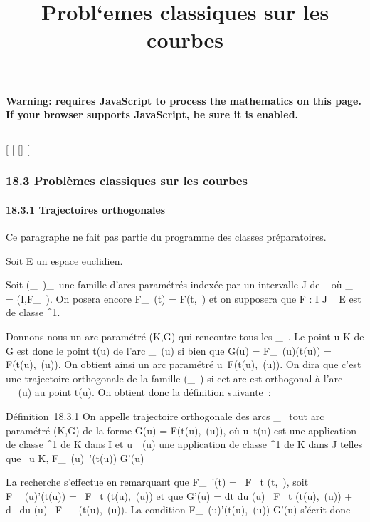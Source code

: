 \documentclass[]{article}
\title{Probl`emes classiques sur les courbes}
\author{}
\date{}
\begin{document}
\maketitle

\textbf{Warning: 
requires JavaScript to process the mathematics on this page.\\ If your
browser supports JavaScript, be sure it is enabled.}

\begin{center}\rule{3in}{0.4pt}\end{center}

[
[
[]
[

\subsubsection{18.3 Problèmes classiques sur les courbes}

\paragraph{18.3.1 Trajectoires orthogonales}

Ce paragraphe ne fait pas partie du programme des classes préparatoires.

Soit E un espace euclidien.

Soit (\Gamma_\lambda~)_\lambda~\inJ une famille d'arcs paramétrés indexée
par un intervalle J de ~ où \Gamma_\lambda~ = (I,F_\lambda~). On posera
encore F_\lambda~(t) = F(t,\lambda~) et on supposera que F : I \times J \rightarrow~ E est de
classe ^1.

Donnons nous un arc paramétré (K,G) qui rencontre tous les \Gamma_\lambda~.
Le point u \in K de G est donc le point t(u) de l'arc \Gamma_\lambda~(u) si
bien que G(u) = F_\lambda~(u)(t(u)) = F(t(u),\lambda~(u)). On obtient ainsi
un arc paramétré u\mapsto~F(t(u),\lambda~(u)). On dira que
c'est une trajectoire orthogonale de la famille (\Gamma_\lambda~) si cet
arc est orthogonal à l'arc \Gamma_\lambda~(u) au point t(u). On obtient
donc la définition suivante~:

Définition~18.3.1 On appelle trajectoire orthogonale des arcs
\Gamma_\lambda~ tout arc paramétré (K,G) de la forme G(u) = F(t(u),\lambda~(u)),
où u\mapsto~t(u) est une application de classe
^1 de K dans I et u\mapsto~\lambda~(u) une
application de classe ^1 de K dans J telles que
\forall~u \in K, F_\lambda~(u)~'(t(u)) \bot G'(u)

La recherche s'effectue en remarquant que F_\lambda~'(t) = \partial~F
\over \partial~t (t,\lambda~), soit F_\lambda~(u)'(t(u)) = \partial~F
\over \partial~t (t(u),\lambda~(u)) et que G'(u) = dt
\over du (u) \partial~F \over \partial~t (t(u),\lambda~(u))
+ d\lambda~ \over du (u) \partial~F \over \partial~\lambda~
(t(u),\lambda~(u)). La condition F_\lambda~(u)'(t(u),\lambda~(u)) \bot G'(u) s'écrit
donc
\end{document}
